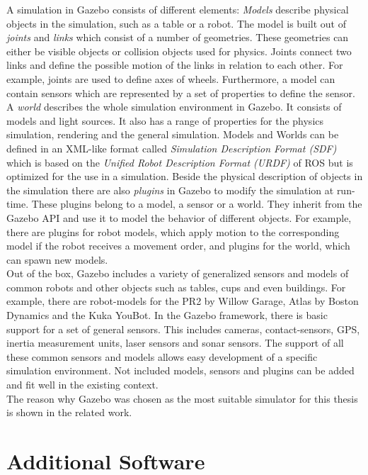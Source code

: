 A simulation in Gazebo consists of different elements: \textit{Models} describe physical objects in the simulation, such as a table or a robot. The model is built out of \textit{joints} and \textit{links} which consist of a number of geometries. These geometries can either be visible objects or collision objects used for physics. Joints connect two links and define the possible motion of the links in relation to each other. For example, joints are used to define axes of wheels. Furthermore, a model can contain sensors which are represented by a set of properties to define the sensor. A \textit{world} describes the whole simulation environment in Gazebo. It consists of models and light sources. It also has a range of properties for the physics simulation, rendering and the general simulation. Models and Worlds can be defined in an XML-like format called \textit{Simulation Description Format (SDF)} which is based on the \textit{Unified Robot Description Format (URDF)} of ROS but is optimized for the use in a simulation. Beside the physical description of objects in the simulation there are also \textit{plugins} in Gazebo to modify the simulation at run-time. These plugins belong to a model, a sensor or a world. They inherit from the Gazebo API and use it to model the behavior of different objects. For example, there are plugins for robot models, which apply motion to the corresponding model if the robot receives a movement order, and plugins for the world, which can spawn new models.\\
Out of the box, Gazebo includes a variety of generalized sensors and models of common robots and other objects such as tables, cups and even buildings. For example, there are robot-models for the PR2 by Willow Garage, Atlas by Boston Dynamics and the Kuka YouBot. In the Gazebo framework, there is basic support for a set of general sensors. This includes cameras, contact-sensors, GPS, inertia measurement units, laser sensors and sonar sensors. The support of all these common sensors and models allows easy development of a specific simulation environment. Not included models, sensors and plugins can be added and fit well in the existing context.\\
The reason why Gazebo was chosen as the most suitable simulator for this thesis is shown in the related work.


\section{Additional Software}
\label{sec:additional_software}
